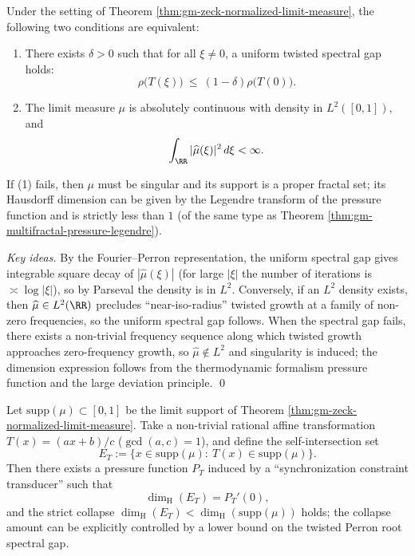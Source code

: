 \begin{theorem}\label{thm:gm-ac-singular-dichotomy}
Under the setting of Theorem \ref{thm:gm-zeck-normalized-limit-measure}, the following two conditions are equivalent:
\begin{enumerate}
  \item There exists \(\delta>0\) such that for all \(\xi\ne 0\), a uniform twisted spectral gap holds:
  \[
  \rho\!\bigl(T(\xi)\bigr)\ \le\ (1-\delta)\rho\!\bigl(T(0)\bigr).
  \]
  \item The limit measure \(\mu\) is absolutely continuous with density in \(L^2([0,1])\), and
  \[
  \int_{\RR}|\widehat\mu(\xi)|^2\,d\xi<\infty.
  \]
\end{enumerate}
If (1) fails, then \(\mu\) must be singular and its support is a proper fractal set; its Hausdorff dimension can be given by the Legendre transform of the pressure function and is strictly less than \(1\) (of the same type as Theorem \ref{thm:gm-multifractal-pressure-legendre}).
\end{theorem}

\begin{proof}[Key ideas]
By the Fourier--Perron representation, the uniform spectral gap gives integrable square decay of \(|\widehat\mu(\xi)|\) (for large \(|\xi|\) the number of iterations is \(\asymp \log|\xi|\)), so by Parseval the density is in \(L^2\).
Conversely, if an \(L^2\) density exists, then \(\widehat\mu\in L^2(\RR)\) precludes ``near-iso-radius'' twisted growth at a family of non-zero frequencies, so the uniform spectral gap follows.
When the spectral gap fails, there exists a non-trivial frequency sequence along which twisted growth approaches zero-frequency growth, so \(\widehat\mu\notin L^2\) and singularity is induced; the dimension expression follows from the thermodynamic formalism pressure function and the large deviation principle. \qed
\end{proof}

\begin{theorem}\label{thm:gm-affine-self-intersection-dimension-drop}
Let \(\mathrm{supp}(\mu)\subset[0,1]\) be the limit support of Theorem \ref{thm:gm-zeck-normalized-limit-measure}.
Take a non-trivial rational affine transformation \(T(x)=(ax+b)/c\) (\(\gcd(a,c)=1\)), and define the self-intersection set
\[
E_T:=\{x\in \mathrm{supp}(\mu):\ T(x)\in \mathrm{supp}(\mu)\}.
\]
Then there exists a pressure function \(P_T\) induced by a ``synchronization constraint transducer'' such that
\[
\dim_{\mathrm{H}}(E_T)=P_T'(0),
\]
and the strict collapse
\(
\dim_{\mathrm{H}}(E_T)<\dim_{\mathrm{H}}(\mathrm{supp}(\mu))
\)
holds; the collapse amount can be explicitly controlled by a lower bound on the twisted Perron root spectral gap.
\end{theorem}

